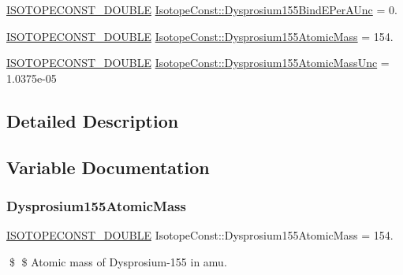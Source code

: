 \begin{DoxyCompactItemize}
\mbox{\hyperlink{group___isotope_const-_macros_ga8f45a7272ce02c0b4c65c44636ed719a}{I\+S\+O\+T\+O\+P\+E\+C\+O\+N\+S\+T\+\_\+\+D\+O\+U\+B\+LE}} \mbox{\hyperlink{group___isotope_const-_dysprosium-_dy155_ga6a234a04587b232260a7ec8d1ec07f7d}{Isotope\+Const\+::\+Dysprosium155\+Bind\+E\+Per\+A\+Unc}} = 0.
\item 
\mbox{\hyperlink{group___isotope_const-_macros_ga8f45a7272ce02c0b4c65c44636ed719a}{I\+S\+O\+T\+O\+P\+E\+C\+O\+N\+S\+T\+\_\+\+D\+O\+U\+B\+LE}} \mbox{\hyperlink{group___isotope_const-_dysprosium-_dy155_ga5cecc6b391fe36ed8ba5458d5d8e881a}{Isotope\+Const\+::\+Dysprosium155\+Atomic\+Mass}} = 154.
\item 
\mbox{\hyperlink{group___isotope_const-_macros_ga8f45a7272ce02c0b4c65c44636ed719a}{I\+S\+O\+T\+O\+P\+E\+C\+O\+N\+S\+T\+\_\+\+D\+O\+U\+B\+LE}} \mbox{\hyperlink{group___isotope_const-_dysprosium-_dy155_gaf051b97d670dee74ce558363e93c19e1}{Isotope\+Const\+::\+Dysprosium155\+Atomic\+Mass\+Unc}} = 1.\+0375e-\/05
\end{DoxyCompactItemize}


\subsection{Detailed Description}


\subsection{Variable Documentation}
\mbox{\label{group___isotope_const-_dysprosium-_dy155_ga5cecc6b391fe36ed8ba5458d5d8e881a}} 
\subsubsection{\texorpdfstring{Dysprosium155\+Atomic\+Mass}{Dysprosium155AtomicMass}}
{\footnotesize\ttfamily \mbox{\hyperlink{group___isotope_const-_macros_ga8f45a7272ce02c0b4c65c44636ed719a}{I\+S\+O\+T\+O\+P\+E\+C\+O\+N\+S\+T\+\_\+\+D\+O\+U\+B\+LE}} Isotope\+Const\+::\+Dysprosium155\+Atomic\+Mass = 154.}

\$ \$ Atomic mass of Dysprosium-\/155 in amu. \mbox{\label{group___isotope_const-_dysprosium-_dy155_gaf051b97d670dee74ce558363e93c19e1}} 
